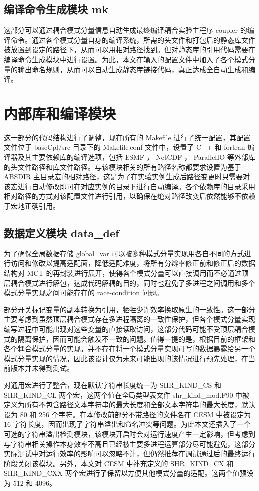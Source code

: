 \subsection{编译命令生成模块 mk}

这部分可以通过耦合模式分量信息自动生成最终编译耦合实验主程序 coupler 的编译命令。通过各个模式分量自身的编译系统，所需的头文件和打包后的静态库文件被放置到设定的路径下，从而可以用相对路径找到。但对静态库的引用代码需要在编译命令生成模块中进行设置。为此，本文在输入的配置文件中加入了各个模式分量的输出命名规则，从而可以自动生成静态库链接代码，真正达成全自动生成和编译。

\section{内部库和编译模块}

这一部分的代码结构进行了调整，现在所有的 Makefile 进行了统一配置，其配置文件位于 baseCpl/src 目录下的 Makefile.conf 文件中，设置了 C++ 和 fortran 编译器及其主要依赖库的编译选项，包括 ESMF ， NetCDF ， ParallelIO 等外部库的头文件路径和库文件路径。与该模块相关的所有路径名称都要求设置为基于 ABSDIR 主目录宏的相对路径，这是为了在实验实例生成后路径变更时只需要对该宏进行自动修改即可在对应实例的目录下进行自动编译。各个依赖库的目录采用相对路径的方式对该配置文件进行引用，以确保在绝对路径改变后依然能够不依赖于宏地正确引用。

\subsection{数据定义模块 data\_def}

为了确保全局数据存储 global\_var 可以被多种模式分量实现用各自不同的方式进行访问和修改以提高适配面，降低适配难度，将所有分辨率修正前和修正后的数据结构对 MCT 的再封装进行展开，使得各个模式分量可以直接调用而不必通过顶层耦合模式进行解包，达成代码解耦的目的，同时也避免了多进程之间调用和多个模式分量实现之间可能存在的 race-condition 问题。

部分开关标记变量的副本转换为引用，牺牲少许效率换取原生的一致性。这一部分主要考虑到虽然顶层耦合模式存在多进程隔离的一致性保护，但各个模式分量实现编写过程中可能出现对这些变量的直接读取访问，这部分代码可能不受顶层耦合模式的隔离保护，因而可能会触发不一致的问题。值得一提的是，根据目前的框架和各个耦合模式分量的实现，并不存在将一个模式分量实现可写的数据暴露给另一个模式分量实现的情况，因此该设计仅为未来可能出现的该情况进行预先处理，在当前版本并未得到测试。

对通用宏进行了整合，现在默认字符串长度统一为 SHR\_KIND\_CS 和 SHR\_KIND\_CL 两个宏，这两个值在全局类型表文件 shr\_kind\_mod.F90 中被定义为所有不包含路径文本字符串的最大长度和全部文本字符串的最大长度，默认设为 80 和 256 个字符。在本修改前部分不带路径的文件名在 CESM 中被设定为 16 字符长度，因而出现了字符串溢出和命名冲突等问题。为此本文还插入了一个可选的字符串溢出检测模块，该模块开启时会对运行速度产生一定影响，但考虑到与字符串相关操作本身效率不高且已经被主要多进程运算部分尽可能避免，这部分实际测试中对运行效率的影响可以忽略不计，但仍然推荐在调试通过后的最终运行阶段关闭该模块。另外，本文对 CESM 中补充定义的 SHR\_KIND\_CX 和 SHR\_KIND\_CXX 两个宏进行了保留以方便其他模式分量的适配。这两个值预设为 512 和 4096。

